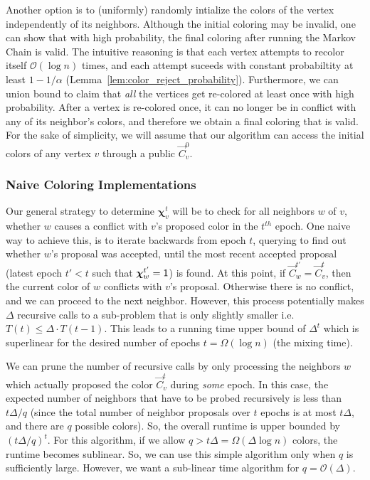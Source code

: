 Another option is to (uniformly) randomly intialize the colors of the vertex independently of its neighbors.
Although the initial coloring may be invalid, one can show that with high probability, the final coloring after running the Markov Chain is valid.
The intuitive reasoning is that each vertex attempts to recolor itself $\mathcal O(\log n)$ times,
and each attempt suceeds with constant probabiltity at least $1 - 1/\alpha$ (Lemma~\ref{lem:color_reject_probability}).
Furthermore, we can union bound to claim that \emph{all} the vertices get re-colored at least once with high probability.
After a vertex is re-colored once, it can no longer be in conflict with any of its neighbor's colors,
and therefore we obtain a final coloring that is valid.
For the sake of simplicity, we will assume that our algorithm can access the initial colors of any vertex $v$ through a public $\vec C^0_v$.

\subsubsection{Naive Coloring Implementations}%
\label{sec:naive_coloring_implementations}
Our general strategy to determine $\bm\chi^t_v$ will be to check for all neighbors $w$ of $v$,
whether $w$ causes a conflict with $v$'s proposed color in the $t^{th}$ epoch.
One naive way to achieve this, is to iterate backwards from epoch $t$, querying to find out whether $w$'s proposal was accepted,
until the most recent accepted proposal (latest epoch $t' < t$ such that $\bm\chi^{t'}_w=\mathsf{1}$) is found.
At this point, if $\vec C^{t'}_w =\vec C^t_v$, then the current color of $w$ conflicts with $v$'s proposal.
Otherwise there is no conflict, and we can proceed to the next neighbor.
However, this process potentially makes $\Delta$ recursive calls to a sub-problem that is only slightly smaller i.e. $T(t) \le \Delta\cdot T(t-1)$.
This leads to a running time upper bound of $\Delta^{t}$ which is superlinear for the desired number of epochs $t = \Omega(\log n)$ (the mixing time).

We can prune the number of recursive calls by only processing the neighbors $w$ which actually proposed the color $\vec C^t_v$ during \emph{some} epoch.
In this case, the expected number of neighbors that have to be probed recursively is less than $t\Delta/q$
(since the total number of neighbor proposals over $t$ epochs is at most $t\Delta$, and there are $q$ possible colors).
So, the overall runtime is upper bounded by $(t\Delta/q)^{t}$.
For this algorithm, if we allow $q > t\Delta = \Omega(\Delta\log n)$ colors, the runtime becomes sublinear.
So, we can use this simple algorithm only when $q$ is sufficiently large.
However, we want a sub-linear time algorithm for $q = \mathcal O(\Delta)$.


